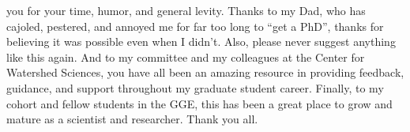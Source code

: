 \documentclass[proquest,12pt,final]{ucthesis-CA2012} %
\begin{document}
\begin{ucfrontmatter}
\begin{acknowledgements}
    you for your time, humor, and general levity. Thanks to my Dad, who has
    cajoled, pestered, and annoyed me for far too long to ``get a PhD'',
    thanks for believing it was possible even when I didn't. Also, please
    never suggest anything like this again. And to my committee and my
    colleagues at the Center for Watershed Sciences, you have all been an
    amazing resource in providing feedback, guidance, and support throughout
    my graduate student career. Finally, to my cohort and fellow students in
    the GGE, this has been a great place to grow and mature as a scientist
    and researcher. Thank you all.
  \end{acknowledgements}

  \begin{abstract}


\end{abstract}
\end{ucfrontmatter}
\end{document}
